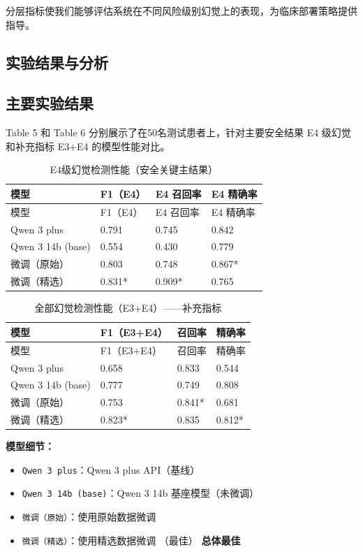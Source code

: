 \documentclass[11pt]{article}
\begin{document}
分层指标使我们能够评估系统在不同风险级别幻觉上的表现，为临床部署策略提供指导。

\subsection{实验结果与分析}

\subsection{主要实验结果}

Table 5 和 Table 6 分别展示了在50名测试患者上，针对主要安全结果 E4 级幻觉和补充指标 E3+E4 的模型性能对比。

\begin{longtable}[]{@{}llll@{}}
\caption{E4级幻觉检测性能（安全关键主结果）}\tabularnewline
\toprule\noalign{}
模型 & F1（E4） & E4 召回率 & E4 精确率 \\
\midrule\noalign{}
\endfirsthead
\toprule\noalign{}
模型 & F1（E4） & E4 召回率 & E4 精确率 \\
\midrule\noalign{}
\endhead
\bottomrule\noalign{}
\endlastfoot
Qwen 3 plus & 0.791 & 0.745 & 0.842 \\
Qwen 3 14b (base) & 0.554 & 0.430 & 0.779 \\
微调（原始） & 0.803 & 0.748 & 0.867* \\
微调（精选） & 0.831* & 0.909* & 0.765 \\
\end{longtable}

\begin{longtable}[]{@{}llll@{}}
\caption{全部幻觉检测性能（E3+E4）------补充指标}\tabularnewline
\toprule\noalign{}
模型 & F1（E3+E4） & 召回率 & 精确率 \\
\midrule\noalign{}
\endfirsthead
\toprule\noalign{}
模型 & F1（E3+E4） & 召回率 & 精确率 \\
\midrule\noalign{}
\endhead
\bottomrule\noalign{}
\endlastfoot
Qwen 3 plus & 0.658 & 0.833 & 0.544 \\
Qwen 3 14b (base) & 0.777 & 0.749 & 0.808 \\
微调（原始） & 0.753 & 0.841* & 0.681 \\
微调（精选） & 0.823* & 0.835 & 0.812* \\
\end{longtable}

\textbf{模型细节：}

\begin{itemize}
\item
  \texttt{Qwen\ 3\ plus}：Qwen 3 plus API（基线）
\item
  \texttt{Qwen\ 3\ 14b\ (base)}：Qwen 3 14b 基座模型（未微调）
\item
  \texttt{微调（原始）}：使用原始数据微调
\item
  \texttt{微调（精选）}：使用精选数据微调 （最佳） \textbf{总体最佳}
\end{itemize}
\end{document}
